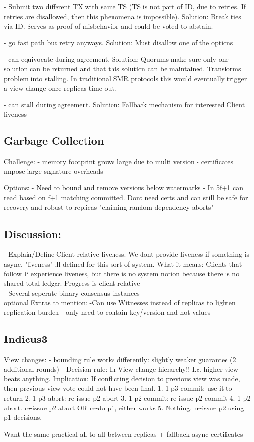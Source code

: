 - Submit two different TX with same TS (TS is not part of ID, due to retries. If retries are disallowed, then this phenomena is impossible). Solution: Break ties via ID. Serves as proof of misbehavior and could be voted to abstain.

- go fast path but retry anyways. Solution: Must disallow one of the options

- can equivocate during agreement. Solution: Quorums make sure only one solution can be returned and that this solution can be maintained. Transforms problem into stalling. In traditional SMR protocols this would eventually trigger a view change once replicas time out.

- can stall during agreement. Solution: Fallback mechanism for interested Client liveness


\subsection{Garbage Collection}
Challenge:
- memory footprint grows large due to multi version
- certificates impose large signature overheads

Options:
- Need to bound and remove versions below watermarks
- In 5f+1 can read based on f+1 matching committed. Dont need certs and can still be safe for recovery and robust to replicas "claiming random dependency aborts"


\subsection{Discussion: }
- Explain/Define Client relative liveness. We dont provide liveness if something is async, "liveness" ill defined for this sort of system. What it means: Clients that follow P experience liveness, but there is no system notion because there is no shared total ledger.  Progress is client relative\\
- Several seperate binary consensus instances \\


optional Extras to mention:
-Can use Witnesses instead of replicas to lighten replication burden
- only need to contain key/version and not values


\subsection{Indicus3}



View changes:
- bounding rule works differently: slightly weaker guarantee (2 additional rounds)
- Decision rule: In View change hierarchy!! I.e. higher view beats anything. Implication: If conflicting decision to previous view was made, then previous view vote could not have been final.
	1. 1 p3 commit: use it to return
	2. 1 p3 abort: re-issue p2 abort 
	3. 1 p2 commit: re-issue p2 commit
	4. 1 p2 abort: re-issue p2 abort OR re-do p1, either works
	5. Nothing: re-issue p2 using p1 decisions.
	
Want the same practical all to all between replicas + fallback async certificates 